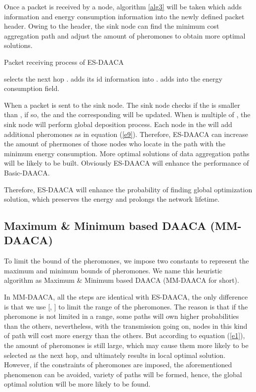 \documentclass{elsarticle}
\begin{document}
Once a packet is received by a node, algorithm \ref{alg3} will be taken which adds  information and energy consumption information into the newly defined packet header. Owing to the header, the sink node can find the minimum cost aggregation path and adjust the amount of pheromones to obtain more optimal solutions.
\begin{algorithm}
\caption{Packet receiving process of ES-DAACA} \label{alg3}
\begin{algorithmic}[1]
 \label{alg3Starts}
\STATE  selects the next hop .
\STATE  adds its id information into .
\STATE  adds  into the energy consumption field. \label{alg3Ends}
\ENDIF
\end{algorithmic}
\end{algorithm}

When a packet is sent to the sink node. The sink node checks if the  is smaller than , if so, the  and the corresponding  will be updated. When  is multiple of , the sink node will perform global deposition process. Each node in the  will add additional  pheromones as in equation (\ref{e9}). Therefore, ES-DAACA can increase the amount of phermones of those nodes who locate in the path with the minimum energy consumption. More optimal solutions of data aggregation paths will be likely to be built. Obviously ES-DAACA will enhance the performance of Basic-DAACA.



Therefore, ES-DAACA will enhance the probability of finding global optimization solution, which preserves the energy and prolongs the network lifetime.

\subsection{Maximum \& Minimum based DAACA (MM-DAACA)} \label{MMDAACA}
To limit the bound of the pheromones, we impose two constants to represent the maximum and minimum bounds of pheromones. We name this heuristic algorithm as Maximum \& Minimum based DAACA (MM-DAACA for short).


In MM-DAACA, all the steps are identical with ES-DAACA, the only difference is that we use [, ] to limit the range of the pheromones. The reason is that if the pheromone is not limited in a range, some paths will own higher probabilities than the others, nevertheless, with the transmission going on, nodes in this kind of path will cost more energy than the others. But according to equation (\ref{e1}), the amount of pheromones is still large, which may cause them more likely to be selected as the next hop, and ultimately results in local optimal solution. However, if the constraints of pheromones are imposed, the aforementioned phenomenon can be avoided, variety of paths will be formed, hence, the global optimal solution will be more likely to be found.
\end{document}
